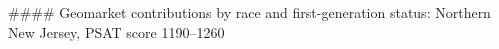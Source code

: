 #### Geomarket contributions by race and first-generation status: Northern New Jersey, PSAT score 1190–1260
